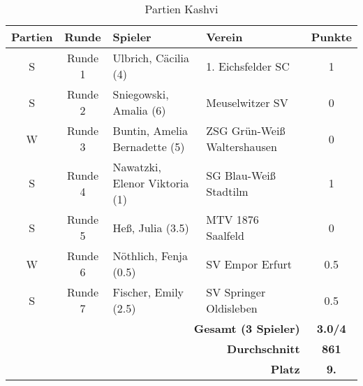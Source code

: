 \begin{table}
\begin{tabular}{|c|c|l|l|c|}
\hline
\textbf{Partien} & \textbf{Runde} & \textbf{Spieler} & \textbf{Verein} & \textbf{Punkte} \\ \hline
S & Runde 1 & Ulbrich, Cäcilia (4) & 1. Eichsfelder SC & 1 \\ \hline
S & Runde 2 & Sniegowski, Amalia (6) & Meuselwitzer SV & 0 \\ \hline
W & Runde 3 & Buntin, Amelia Bernadette (5) & ZSG Grün-Weiß Waltershausen & 0 \\ \hline
S & Runde 4 & Nawatzki, Elenor Viktoria (1) & SG Blau-Weiß Stadtilm & 1 \\ \hline
S & Runde 5 & Heß, Julia (3.5) & MTV 1876 Saalfeld & 0 \\ \hline
W & Runde 6 & Nöthlich, Fenja (0.5) & SV Empor Erfurt & 0.5 \\ \hline
S & Runde 7 & Fischer, Emily (2.5) & SV Springer Oldisleben & 0.5 \\ \hline
\multicolumn{4}{|r|}{\textbf{Gesamt (3 Spieler)}} & \textbf{3.0/4} \\ \hline
\multicolumn{4}{|r|}{\textbf{Durchschnitt}} & \textbf{861} \\ \hline
\multicolumn{4}{|r|}{\textbf{Platz}} & \textbf{9.} \\ \hline
\end{tabular}
\caption{Partien Kashvi}
\label{label:Tabelle_Kashvi}
\end{table}